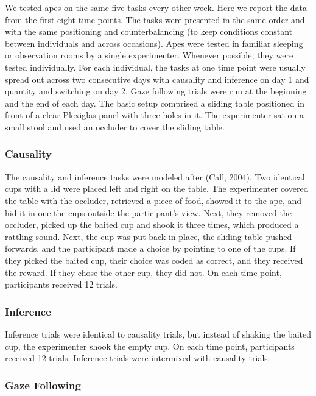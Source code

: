 \documentclass[10pt, letterpaper]{article}
\begin{document}
We tested apes on the same five tasks every other week. Here we report
the data from the first eight time points. The tasks were presented in
the same order and with the same positioning and counterbalancing (to
keep conditions constant between individuals and across occasions). Apes
were tested in familiar sleeping or observation rooms by a single
experimenter. Whenever possible, they were tested individually. For each
individual, the tasks at one time point were usually spread out across
two consecutive days with causality and inference on day 1 and quantity
and switching on day 2. Gaze following trials were run at the beginning
and the end of each day. The basic setup comprised a sliding table
positioned in front of a clear Plexiglas panel with three holes in it.
The experimenter sat on a small stool and used an occluder to cover the
sliding table.

\hypertarget{causality}{%
\subsubsection{Causality}\label{causality}}

The causality and inference tasks were modeled after (Call, 2004). Two
identical cups with a lid were placed left and right on the table. The
experimenter covered the table with the occluder, retrieved a piece of
food, showed it to the ape, and hid it in one the cups outside the
participant's view. Next, they removed the occluder, picked up the
baited cup and shook it three times, which produced a rattling sound.
Next, the cup was put back in place, the sliding table pushed forwards,
and the participant made a choice by pointing to one of the cups. If
they picked the baited cup, their choice was coded as correct, and they
received the reward. If they chose the other cup, they did not. On each
time point, participants received 12 trials.

\hypertarget{inference}{%
\subsubsection{Inference}\label{inference}}

Inference trials were identical to causality trials, but instead of
shaking the baited cup, the experimenter shook the empty cup. On each
time point, participants received 12 trials. Inference trials were
intermixed with causality trials.

\hypertarget{gaze-following}{%
\subsubsection{Gaze Following}\label{gaze-following}}
\end{document}
